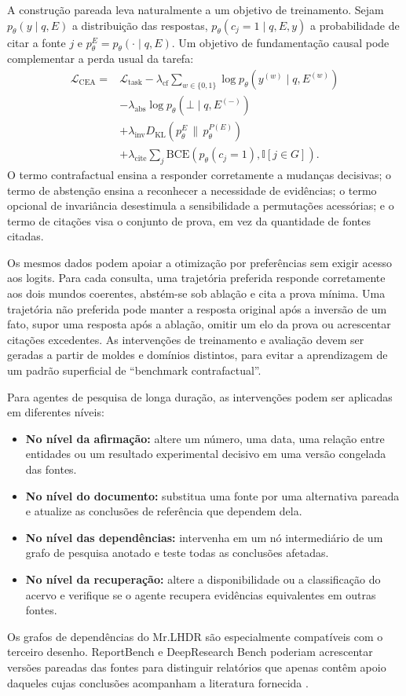 \documentclass[10pt,twocolumn]{article}
\newcommand{\ind}{\mathbb{I}}
\newcommand{\botans}{\bot}
\begin{document}
A construção pareada leva naturalmente a um objetivo de treinamento. Sejam $p_\theta(y\mid q,E)$ a distribuição das respostas, $p_\theta(c_j=1\mid q,E,y)$ a probabilidade de citar a fonte $j$ e $p_\theta^E=p_\theta(\cdot\mid q,E)$. Um objetivo de fundamentação causal pode complementar a perda usual da tarefa:
\begin{align}
\mathcal{L}_{\mathrm{CEA}} ={}& \mathcal{L}_{\mathrm{task}}
-\lambda_{\mathrm{cf}}\sum_{w\in\{0,1\}}\log p_\theta(y^{(w)}\mid q,E^{(w)})\nonumber\\
&-\lambda_{\mathrm{abs}}\log p_\theta(\botans\mid q,E^{(-)})\nonumber\\
&+\lambda_{\mathrm{inv}}D_{\mathrm{KL}}\!\left(p_\theta^E\,\|\,p_\theta^{P(E)}\right)\nonumber\\
&+\lambda_{\mathrm{cite}}\sum_j \mathrm{BCE}\!\left(p_\theta(c_j=1),\ind[j\in G]\right).
\end{align}
O termo contrafactual ensina a responder corretamente a mudanças decisivas; o termo de abstenção ensina a reconhecer a necessidade de evidências; o termo opcional de invariância desestimula a sensibilidade a permutações acessórias; e o termo de citações visa o conjunto de prova, em vez da quantidade de fontes citadas.

Os mesmos dados podem apoiar a otimização por preferências sem exigir acesso aos logits. Para cada consulta, uma trajetória preferida responde corretamente aos dois mundos coerentes, abstém-se sob ablação e cita a prova mínima. Uma trajetória não preferida pode manter a resposta original após a inversão de um fato, supor uma resposta após a ablação, omitir um elo da prova ou acrescentar citações excedentes. As intervenções de treinamento e avaliação devem ser geradas a partir de moldes e domínios distintos, para evitar a aprendizagem de um padrão superficial de ``benchmark contrafactual''.

Para agentes de pesquisa de longa duração, as intervenções podem ser aplicadas em diferentes níveis:
\begin{itemize}[leftmargin=*,itemsep=1pt,topsep=3pt]
    \item \textbf{No nível da afirmação:} altere um número, uma data, uma relação entre entidades ou um resultado experimental decisivo em uma versão congelada das fontes.
    \item \textbf{No nível do documento:} substitua uma fonte por uma alternativa pareada e atualize as conclusões de referência que dependem dela.
    \item \textbf{No nível das dependências:} intervenha em um nó intermediário de um grafo de pesquisa anotado e teste todas as conclusões afetadas.
    \item \textbf{No nível da recuperação:} altere a disponibilidade ou a classificação do acervo e verifique se o agente recupera evidências equivalentes em outras fontes.
\end{itemize}
Os grafos de dependências do Mr.LHDR \citep{guo2026mrlhdr} são especialmente compatíveis com o terceiro desenho. ReportBench e DeepResearch Bench poderiam acrescentar versões pareadas das fontes para distinguir relatórios que apenas contêm apoio daqueles cujas conclusões acompanham a literatura fornecida \citep{li2025reportbench,du2025deepresearch}.
\end{document}
